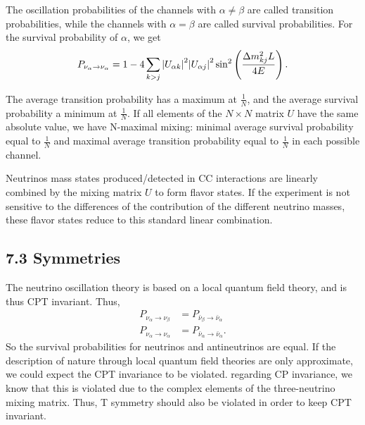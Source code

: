 \documentclass[twocolumn]{article}
\newcommand{\na}{\ensuremath{\nu_\alpha}}
\newcommand{\nb}{\ensuremath{\nu_\beta}}
\newcommand{\ana}{\ensuremath{\bar{\nu}_\alpha}}
\newcommand{\anb}{\ensuremath{\bar{\nu}_\beta}}
\begin{document}
The oscillation probabilities of the channels with $\alpha \neq \beta$ are called transition probabilities, while the channels with $\alpha = \beta$ are called survival probabilities. For the survival probability of $\alpha$, we get 
\begin{align*}
  P_{\na \to \nu_\alpha} = 1-4\sum_{k > j}\abs{U_{\alpha k}}^2 \abs{U_{\alpha j}}^2 \sin^2 \left( \frac{\Delta m_{kj}^2 L}{4E} \right)
.\end{align*}

The average transition probability has a maximum at $\frac{1}{N}$, and the average survival probability a minimum at $\frac{1}{N}$. If all elements of the $N \times N$ matrix $U$ have the same absolute value, we have N-maximal mixing: minimal average survival probability equal to $\frac{1}{N}$ and maximal average transition probability equal to $\frac{1}{N}$ in each possible channel. 

Neutrinos mass states produced/detected in CC interactions are linearly combined by the mixing matrix $U$ to form flavor states. If the experiment is not sensitive to the differences of the contribution of the different neutrino masses, these flavor states reduce to this standard linear combination. 

\subsection*{7.3 Symmetries}
The neutrino oscillation theory is based on a local quantum field theory, and is thus CPT invariant. Thus,
\begin{align*}
  P_{\na \to \nb} &= P_{\anb \to \ana} \\
  P_{\na \to \na} &= P_{\ana \to \ana} 
.\end{align*}
So the survival probabilities for neutrinos and antineutrinos are equal. If the description of nature through local quantum field theories are only approximate, we could expect the CPT invariance to be violated. 
regarding CP invariance, we know that this is violated due to the complex elements of the three-neutrino mixing matrix. Thus, T symmetry should also be violated in order to keep CPT invariant.
\end{document}

